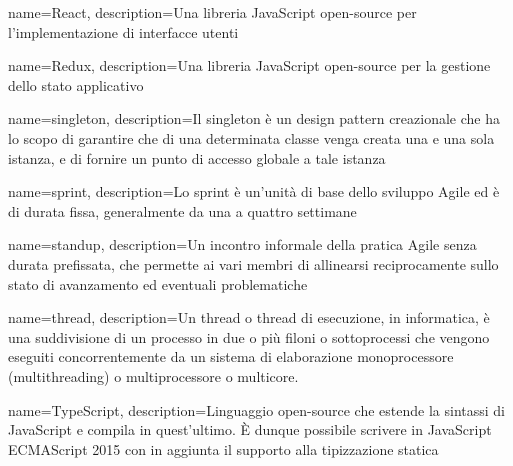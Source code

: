 {
    name=React,
    description={Una libreria JavaScript open-source per l'implementazione di interfacce utenti}
}

{
    name=Redux,
    description={Una libreria JavaScript open-source per la gestione dello stato applicativo}
}

{
    name=singleton,
    description={Il singleton è un design pattern creazionale che ha lo scopo di garantire che di una determinata classe venga creata una e una sola istanza, e di fornire un punto di accesso globale a tale istanza}
}

{
    name=sprint,
    description={Lo sprint è un'unità di base dello sviluppo Agile ed è di durata fissa, generalmente da una a quattro settimane}
}

{
    name=standup,
    description={Un incontro informale della pratica Agile senza durata prefissata, che permette ai vari membri di allinearsi reciprocamente sullo stato di avanzamento ed eventuali problematiche}
}

{
    name=thread,
    description={Un thread o thread di esecuzione, in informatica, è una suddivisione di un processo in due o più filoni o sottoprocessi che vengono eseguiti concorrentemente da un sistema di elaborazione monoprocessore (multithreading) o multiprocessore o multicore. }
}

{
    name=TypeScript,
    description={Linguaggio open-source che estende la sintassi di JavaScript e compila in quest'ultimo. È dunque possibile scrivere in JavaScript ECMAScript 2015 con in aggiunta il supporto alla tipizzazione statica}
}
